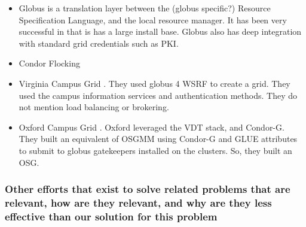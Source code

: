 \documentclass[11pt]{article}
\begin{document}
\begin{itemize}
\item
Globus is a translation layer between the (globus specific?) Resource Specification Language, and the local resource manager.  It has been very successful in that is has a large install base.  Globus also has deep integration with standard grid credentials such as PKI.

\item
Condor Flocking

\item
Virginia Campus Grid \cite{humphrey2005university}.  They used globus 4 WSRF to create a grid.  They used the campus information services and authentication methods.  They do not mention load balancing or brokering.

\item
Oxford Campus Grid \cite{wallom2006oxgrid}.  Oxford leveraged the VDT stack, and Condor-G.  They built an equivalent of OSGMM using Condor-G and GLUE attributes to submit to globus gatekeepers installed on the clusters.  So, they built an OSG.



\end{itemize}


\subsubsection*{Other efforts that exist to solve related problems that are
relevant, how are they relevant, and why are they less effective than our
solution for this problem}
\end{document}
